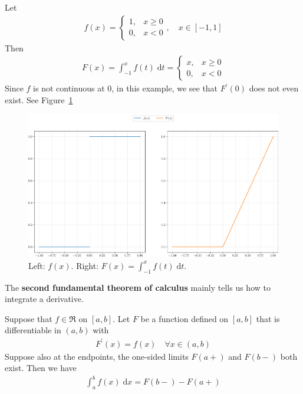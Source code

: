 \documentclass[thmcnt=section, 12pt]{my-elegantbook}
\begin{document}
\begin{example} \label{eg:12}
	Let 
	\begin{align*}
		f(x) = \begin{cases}
			1,
			&x \geq 0 \\ 
			0,
			&x < 0 
		\end{cases},
		\quad x \in [-1, 1]
	\end{align*}
	Then 
	\begin{align*}
		F(x)
		= \int_{-1}^x f(t) \; \mathrm{d} t
		= \begin{cases}
			x,
			&x \geq 0 \\ 
			0, 
			&x < 0 
		\end{cases}
	\end{align*}
	Since $f$ is not continuous at $0$, in this example,
	we see that $F^\prime(0)$ does not even exist. 
	See Figure~\ref{fig:15}
	\begin{figure}[ht]
		\centering
		\includegraphics[scale=0.5]{figures/ma-015.png}
		\caption{Left: $f(x)$. Right: $F(x) = \int_{-1}^x f(t) \; \mathrm{d} t$.}
		\label{fig:15}
	\end{figure}
\end{example}


The \textbf{second fundamental theorem of calculus}
mainly tells us how to integrate a derivative.

\begin{theorem} \label{thm:82}
	Suppose that $f \in \mathfrak{R}$ on $[a, b]$.
	Let $F$ be a function defined on $[a, b]$ 
	that is differentiable in $(a, b)$
	with 
	\begin{align*}
		F^\prime(x) = f(x)
		\quad \forall x \in (a, b)
	\end{align*}
	Suppose also at the endpoints, the one-sided limits 
	$F(a+)$ and $F(b-)$ both exist.
	Then we have 
	\begin{align}
		\int_a^b f(x) \; \mathrm{d} x
		= F(b-) - F(a+)
		\label{eq:144}
	\end{align}
\end{theorem}
\end{document}

